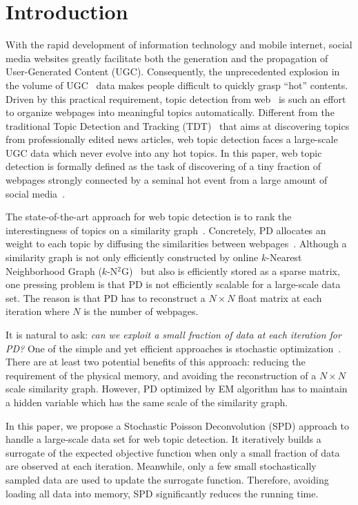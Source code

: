 \documentclass[runningheads]{llncs}
\begin{document}
\section{Introduction}
\label{sec:intro}
With the rapid development of information technology and mobile internet, social media websites greatly facilitate both the generation and the propagation of User-Generated Content (UGC). Consequently, the unprecedented explosion in the volume of UGC~\cite{pang-2013-unsupervised} data makes people difficult to quickly grasp ``hot'' contents. Driven by this practical requirement, topic detection from web~\cite{pang-2013-unsupervised,zhang-2013-cross,pang-tao-2016-lpd} is such an effort to organize webpages into meaningful topics automatically. Different from the traditional Topic Detection and Tracking (TDT)~\cite{allan-1998-TDT} that aims at discovering topics from professionally edited news articles, web topic detection faces a large-scale UGC data which never evolve into any hot topics.
In this paper, web topic detection is formally defined as the task of discovering of a tiny fraction of webpages strongly connected by a seminal hot event from a large amount of social media~\cite{pang-2013-unsupervised}.

The state-of-the-art approach for web topic detection is to rank the interestingness of topics on a similarity graph~\cite{pang-2013-unsupervised,pang-tao-2018-neurocomputing}. Concretely, PD allocates an weight to each topic by diffusing the similarities between webpages~\cite{pang-2013-unsupervised}. Although a similarity graph is not only efficiently constructed by online $k$-Nearest Neighborhood Graph ($k$-N$^2$G)~\cite{debatty-2016-fastonlineknn} but also is efficiently stored as a sparse matrix, one pressing problem is that PD is not efficiently scalable for a large-scale data set. The reason is that PD has to reconstruct a $N\times N$ float matrix at each iteration where $N$ is the number of webpages.

It is natural to ask: \emph{can we exploit a small fraction of data at each iteration for PD?} One of the simple and yet efficient approaches is stochastic optimization~\cite{hannah-2015-Stochastic}. There are at least two potential benefits of this approach: reducing the requirement of the physical memory, and avoiding the reconstruction of a $N\times N$ scale similarity graph. However, PD optimized by EM algorithm has to maintain a hidden variable which has the same scale of the similarity graph.

In this paper, we propose a Stochastic Poisson Deconvolution (SPD) approach to handle a large-scale data set for web topic detection. It iteratively builds a surrogate of the expected objective function when only a small fraction of data are observed at each iteration. Meanwhile, only a few small stochastically sampled data are used to update the surrogate function. Therefore, avoiding loading all data into memory, SPD significantly reduces the running time.
\end{document}
